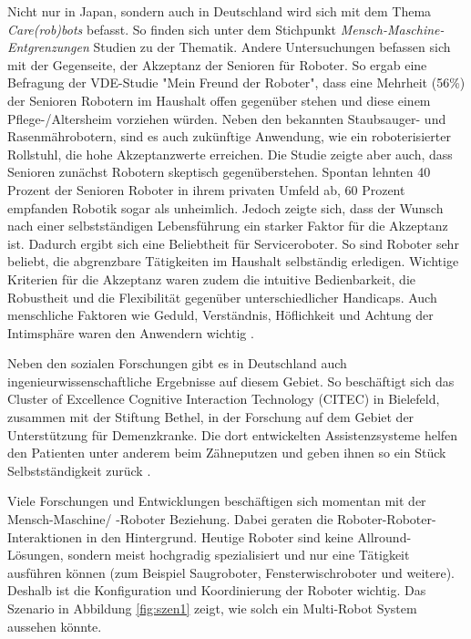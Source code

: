 Nicht nur in Japan, sondern auch in Deutschland wird sich mit dem Thema \textit{Care(rob)bots} befasst. So finden sich unter dem Stichpunkt \textit{Mensch-Maschine-Entgrenzungen} Studien zu der Thematik. Andere Untersuchungen befassen sich mit der Gegenseite, der Akzeptanz der Senioren für Roboter. So ergab eine Befragung der VDE-Studie "Mein Freund der Roboter", dass eine Mehrheit (56\%) der Senioren Robotern im Haushalt offen gegenüber stehen und diese einem Pflege-/Altersheim vorziehen würden. Neben den bekannten Staubsauger- und Rasenmährobotern, sind es auch zukünftige Anwendung, wie ein roboterisierter Rollstuhl, die hohe Akzeptanzwerte erreichen. Die Studie zeigte aber auch, dass Senioren zunächst Robotern skeptisch gegenüberstehen. Spontan lehnten 40 Prozent der Senioren Roboter in ihrem privaten Umfeld ab, 60 Prozent empfanden Robotik sogar als unheimlich. Jedoch zeigte sich, dass der Wunsch nach einer selbstständigen Lebensführung ein starker Faktor für die Akzeptanz ist. Dadurch ergibt sich eine Beliebtheit für Serviceroboter. So sind Roboter sehr beliebt, die abgrenzbare Tätigkeiten im Haushalt selbständig erledigen. Wichtige Kriterien für die Akzeptanz waren zudem die intuitive Bedienbarkeit, die Robustheit und die Flexibilität gegenüber unterschiedlicher Handicaps. Auch menschliche Faktoren wie Geduld, Verständnis, Höflichkeit und Achtung der Intimsphäre waren den Anwendern wichtig \citep{dr.sibyllemeyer2011}.

Neben den sozialen Forschungen gibt es in Deutschland auch ingenieurwissenschaftliche Ergebnisse auf diesem Gebiet. So beschäftigt sich das Cluster of Excellence Cognitive Interaction Technology (CITEC) in Bielefeld, zusammen mit der Stiftung Bethel, in der Forschung auf dem Gebiet der Unterstützung für Demenzkranke. Die dort entwickelten Assistenzsysteme helfen den Patienten unter anderem beim Zähneputzen und geben ihnen so ein Stück Selbstständigkeit zurück \citep{peters2010task}. 

Viele Forschungen und Entwicklungen beschäftigen sich momentan mit der Mensch-Maschine/ -Roboter Beziehung. Dabei geraten die Roboter-Roboter-Interaktionen in den Hintergrund. Heutige Roboter sind keine Allround-Lösungen, sondern meist hochgradig spezialisiert und nur eine Tätigkeit ausführen können (zum Beispiel Saugroboter, Fensterwischroboter und weitere). Deshalb ist die Konfiguration und Koordinierung der Roboter wichtig. Das Szenario in Abbildung \ref{fig:szen1} zeigt, wie solch ein Multi-Robot System aussehen könnte.

